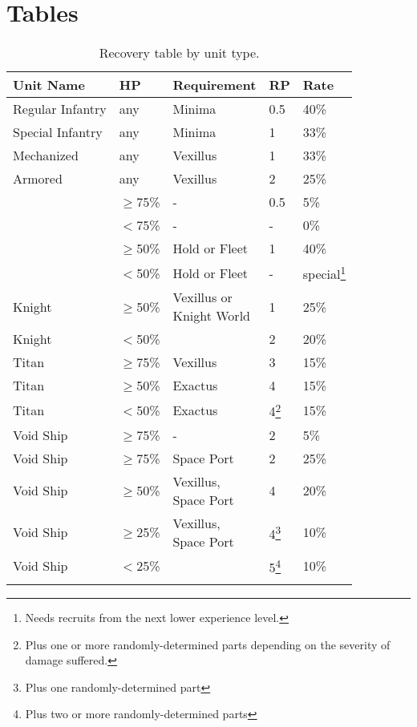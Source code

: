 \chapter{Tables}
\begin{center}
 \begin{longtable}{l l l l l}\toprule
	Unit Name & HP & Requirement & RP & Rate \\ \endhead\midrule
	Regular Infantry & any & Minima & 0.5 & 40\% \\
	Special Infantry & any & Minima & 1 & 33\% \\
	Mechanized & any & Vexillus & 1 & 33\% \\
	Armored & any & Vexillus & 2 & 25\% \\
	\makecell[cl]{Astartes} & $\ge$75\% & - & 0.5 & 5\%\\
	\makecell[cl]{Astartes} & $<$75\% & - & - & 0\%\\  
	\makecell[cl]{Astartes} & $\ge$50\% & Hold or Fleet & 1 & 40\%\\
	\makecell[cl]{Astartes} & $<$50\% & Hold or Fleet & - & special\footnote{Needs recruits from the next lower experience level.}\\
	Knight & $\ge$50\% & \makecell[lc]{Vexillus or\\Knight World} & 1 & 25\%\\
	Knight & $<$50\% & \makecell[lc]{Exactus} & 2 & 20\%\\
	Titan & $\ge$75\% & Vexillus & 3 & 15\% \\
	Titan & $\ge$50\% & Exactus & 4 & 15\% \\
	Titan & $<$50\% & Exactus & 4\footnote{Plus one or more randomly-determined parts depending on the severity of damage suffered.} & 15\% \\
	Void Ship & $\ge$75\% & - & 2 & 5\%\\
	Void Ship & $\ge$75\% & Space Port & 2 & 25\%\\
	Void Ship & $\ge$50\% & \makecell[cl]{Vexillus,\\Space Port} & 4 & 20\%\\
	Void Ship & $\ge$25\% & \makecell[cl]{Vexillus,\\Space Port} & 4\footnote{Plus one randomly-determined part} & 10\%\\
	Void Ship & $<$25\% & \makecell[cl]{Exactus} & 5\footnote{Plus two or more randomly-determined parts}  & 10\%\\
	\bottomrule
	\caption{Recovery table by unit type.\label{recovery_table}}\\
\end{longtable}	
\end{center}

